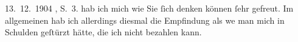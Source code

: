 \begin{ledgroupsized}[t]{13cm}
{{{                           13. 12. 1904 , S. 3.}}}\label{K_L02993-1h} hab ich mich wie Sie ſich
                  denken können ſehr gefreut. Im allgemeinen hab ich allerdings diesmal die
                  Empfindung als we{\geminationn} man mich in Schulden geſtürzt
                  hätte, die ich nicht bezahlen kann. \pend
           
         
         \endnumbering{}\end{ledgroupsized}\begin{anhang}\end{anhang}\newcommand{\dateiname}{L02993}\newcommand{\titel}{Arthur Schnitzler an Felix Salten, 13. 12. 1904}\newcommand{\editorInnen}{Martin Anton Müller und Laura Untner}
      